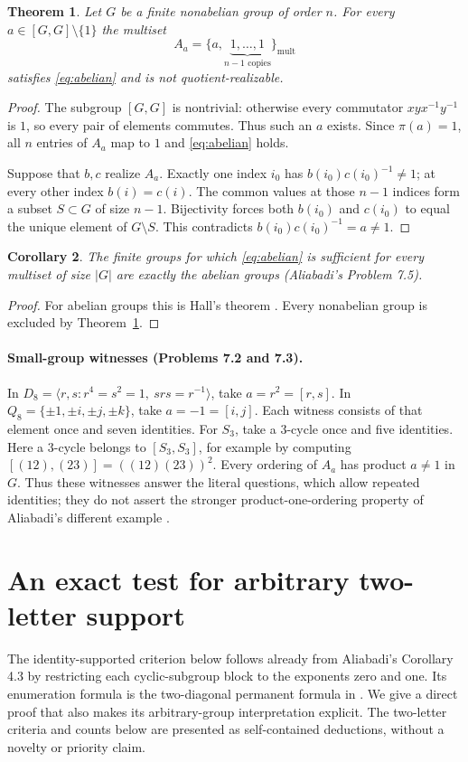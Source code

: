 \documentclass[11pt]{article}
\newtheorem{theorem}{Theorem}
\newtheorem{corollary}[theorem]{Corollary}
\newcommand{\mult}{\mathrm{mult}}
\begin{document}
\begin{theorem}\label{thm:main}
Let $G$ be a finite nonabelian group of order $n$. For every
$a\in[G,G]\setminus\{1\}$ the multiset
\[
 A_a=\{a,\underbrace{1,\ldots,1}_{n-1\text{ copies}}\}_{\mult}
\]
satisfies \eqref{eq:abelian} and is not quotient-realizable.
\end{theorem}
\begin{proof}
The subgroup $[G,G]$ is nontrivial: otherwise every commutator
$xyx^{-1}y^{-1}$ is $1$, so every pair of elements commutes.
Thus such an $a$ exists. Since $\pi(a)=1$, all $n$ entries of $A_a$
map to $1$ and \eqref{eq:abelian} holds.

Suppose that $b,c$ realize $A_a$. Exactly one index $i_0$ has
$b(i_0)c(i_0)^{-1}\ne1$; at every other index $b(i)=c(i)$.
The common values at those $n-1$ indices form a subset $S\subset G$
of size $n-1$. Bijectivity forces both $b(i_0)$ and $c(i_0)$ to equal
the unique element of $G\setminus S$. This contradicts
$b(i_0)c(i_0)^{-1}=a\ne1$.
\end{proof}

\begin{corollary}\label{cor:abelian}
The finite groups for which \eqref{eq:abelian} is sufficient for every
multiset of size $|G|$ are exactly the abelian groups
(Aliabadi's Problem 7.5).
\end{corollary}
\begin{proof}
For abelian groups this is Hall's theorem \cite{Hall}.
Every nonabelian group is excluded by Theorem~\ref{thm:main}.
\end{proof}

\paragraph{Small-group witnesses (Problems 7.2 and 7.3).}
In $D_8=\langle r,s:r^4=s^2=1,\ srs=r^{-1}\rangle$, take
$a=r^2=[r,s]$. In $Q_8=\{\pm1,\pm i,\pm j,\pm k\}$, take
$a=-1=[i,j]$. Each witness consists of that element once and seven
identities. For $S_3$, take a $3$-cycle once and five identities.
Here a $3$-cycle belongs to $[S_3,S_3]$, for example by computing
$[(12),(23)]=((12)(23))^2$.
Every ordering of $A_a$ has product $a\ne1$ in $G$. Thus these
witnesses answer the literal questions, which allow repeated identities;
they do not assert the stronger product-one-ordering property of
Aliabadi's different example \cite[Propositions 5.2 and 5.4]{Aliabadi}.

\section{An exact test for arbitrary two-letter support}
The identity-supported criterion below follows already from
Aliabadi's Corollary 4.3 by restricting each cyclic-subgroup block to
the exponents zero and one. Its enumeration formula is the two-diagonal
permanent formula in \cite[Remark 2.5]{DePoi}. We give a direct proof
that also makes its arbitrary-group interpretation explicit.
The two-letter criteria and counts below are presented as self-contained
deductions, without a novelty or priority claim.
\end{document}
